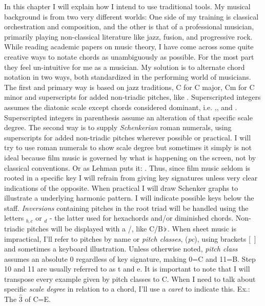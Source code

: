 In this chapter I will explain how I intend to use traditional tools. My musical background is from two very different worlds: One side of my training is classical orchestration and composition, and the other is that of a professional musician, primarily playing non-classical literature like jazz, fusion, and progressive rock. While reading academic papers on music theory, I have come across some quite creative ways to notate chords as unambiguously as possible. For the most part they feel un-intuitive for me as a musician. My solution is to alternate chord notation in two ways, both standardized in the performing world of musicians. The first and primary way is based on jazz traditions, C for C major, Cm for C minor and superscripts for added non-triadic pitches, like . Superscripted integers assumes the diatonic scale except chords considered dominant, i.e. ,,  and . Superscripted integers in parenthesis assume an alteration of that specific scale degree. The second way is to supply \textit{Schenkerian} roman numerals, using superscripts for added non-triadic pitches wherever possible or practical. I will try to use roman numerals to show scale degree but sometimes it simply is not ideal because film music is governed by what is happening on the screen, not by classical conventions. Or as Lehman puts it: . Thus, since film music seldom is rooted in a specific key I will refrain from giving key signatures unless very clear indications of the opposite. When practical I will draw Schenker graphs to illustrate a underlying harmonic pattern. I will indicate possible keys below the staff. \textit{Inversions} containing pitches in the root triad will be handled using the letters \(_{b, c}\) or \(_{d}\) - the latter used for hexachords and/or diminished chords. Non-triadic pitches will be displayed with a /, like C/B\(\hspace*{0.18ex}\flat\hspace*{0.18ex}\). When sheet music is impractical, I'll refer to pitches by name or \textit{pitch classes}, (\textit{pc}), using brackets [~] and sometimes a keyboard illustration. Unless otherwise noted, \textit{pitch class} assumes an absolute 0 regardless of key signature, making 0=C and 11=B. Step 10 and 11 are usually referred to as t and e. It is important to note that I will transpose every example given by pitch classes to C. When I need to talk about specific \textit{scale degree} in relation to a chord, I'll use a \textit{caret} to indicate this. Ex.: The \(\hat{3}\) of C=E.
